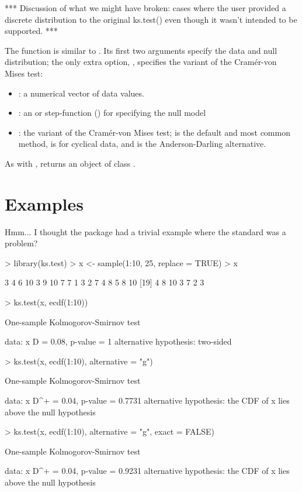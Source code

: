 *** Discussion of what we might have broken: cases where the user
provided a discrete distribution to the original ks.test() even though
it wasn't intended to be supported. ***

The function  is similar to .  Its first two
arguments specify the data and null distribution; the only extra option,
, specifies the variant of the Cram\'{e}r-von Mises test:
\begin{itemize}
\item {}: a numerical vector of data values.
\item {}: an  or step-function () for specifying
the null model
\item {}: the variant of the Cram\'{e}r-von Mises test; 
is the default and most common method,  is for cyclical data,
and  is the Anderson-Darling alternative.
\end{itemize}
As with ,  returns an object of class 
.

 
\section{Examples}

Hmm... I thought the package had a trivial example where the standard
 was a problem?
\begin{Schunk}
\begin{Sinput}
> library(ks.test)
> x <- sample(1:10, 25, replace = TRUE)
> x
\end{Sinput}
\begin{Soutput}
 [1]  3  4  6 10  3  9 10  7  7  1  3  2  7  4  8  5  8 10
[19]  4  8 10  3  7  2  3
\end{Soutput}
\begin{Sinput}
> ks.test(x, ecdf(1:10))
\end{Sinput}
\begin{Soutput}
	One-sample Kolmogorov-Smirnov test

data:  x 
D = 0.08, p-value = 1
alternative hypothesis: two-sided 
\end{Soutput}
\begin{Sinput}
> ks.test(x, ecdf(1:10), alternative = "g")
\end{Sinput}
\begin{Soutput}
	One-sample Kolmogorov-Smirnov test

data:  x 
D^+ = 0.04, p-value = 0.7731
alternative hypothesis: the CDF of x lies above the null hypothesis 
\end{Soutput}
\begin{Sinput}
> ks.test(x, ecdf(1:10), alternative = "g", exact = FALSE)
\end{Sinput}
\begin{Soutput}
	One-sample Kolmogorov-Smirnov test

data:  x 
D^+ = 0.04, p-value = 0.9231
alternative hypothesis: the CDF of x lies above the null hypothesis 
\end{Soutput}
\end{Schunk}


